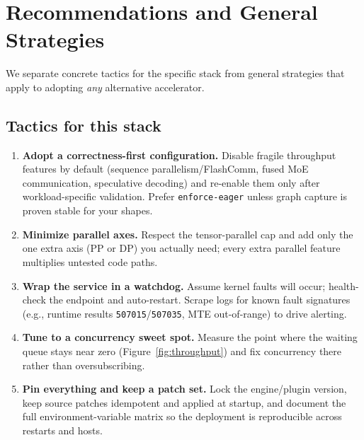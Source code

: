 \documentclass{article}
\newcommand{\code}[1]{\texttt{#1}}
\begin{document}
\section{Recommendations and General Strategies}
\label{sec:mitigations}
We separate concrete tactics for the specific stack from general strategies that
apply to adopting \emph{any} alternative accelerator.

\subsection{Tactics for this stack}
\begin{enumerate}
  \item \textbf{Adopt a correctness-first configuration.} Disable fragile
        throughput features by default (sequence parallelism/FlashComm, fused MoE
        communication, speculative decoding) and re-enable them only after
        workload-specific validation. Prefer \code{enforce-eager} unless graph
        capture is proven stable for your shapes.
  \item \textbf{Minimize parallel axes.} Respect the tensor-parallel cap and add
        only the one extra axis (PP or DP) you actually need; every extra parallel
        feature multiplies untested code paths.
  \item \textbf{Wrap the service in a watchdog.} Assume kernel faults will occur;
        health-check the endpoint and auto-restart. Scrape logs for known fault
        signatures (e.g., runtime results \code{507015}/\code{507035}, MTE
        out-of-range) to drive alerting.
  \item \textbf{Tune to a concurrency sweet spot.} Measure the point where the
        waiting queue stays near zero (Figure~\ref{fig:throughput}) and fix
        concurrency there rather than oversubscribing.
  \item \textbf{Pin everything and keep a patch set.} Lock the engine/plugin
        version, keep source patches idempotent and applied at startup, and
        document the full environment-variable matrix so the deployment is
        reproducible across restarts and hosts.
\end{enumerate}
\end{document}
